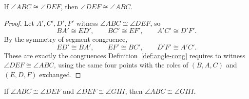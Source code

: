 \documentclass[../../../main/main.tex]{subfiles}
\begin{document}
\begin{theorem}\label{thm:angle-cong-sym}
If $\angle ABC \cong \angle DEF$, then $\angle DEF \cong \angle ABC$.
\end{theorem}
\begin{proof}
Let $A', C', D', F'$ witness $\angle ABC \cong \angle DEF$, so
\[
BA' \cong ED', \qquad BC' \cong EF', \qquad A'C' \cong D'F'.
\]
By the symmetry of segment congruence,
\[
ED' \cong BA', \qquad EF' \cong BC', \qquad D'F' \cong A'C'.
\]
These are exactly the congruences Definition~\ref{def:angle-cong} requires to witness $\angle DEF \cong \angle ABC$, using the same four points with the roles of $(B,A,C)$ and $(E,D,F)$ exchanged.
\end{proof}

\begin{theorem}\label{thm:angle-cong-trans}
If $\angle ABC \cong \angle DEF$ and $\angle DEF \cong \angle GHI$, then $\angle ABC \cong \angle GHI$.
\end{theorem}
\end{document}

